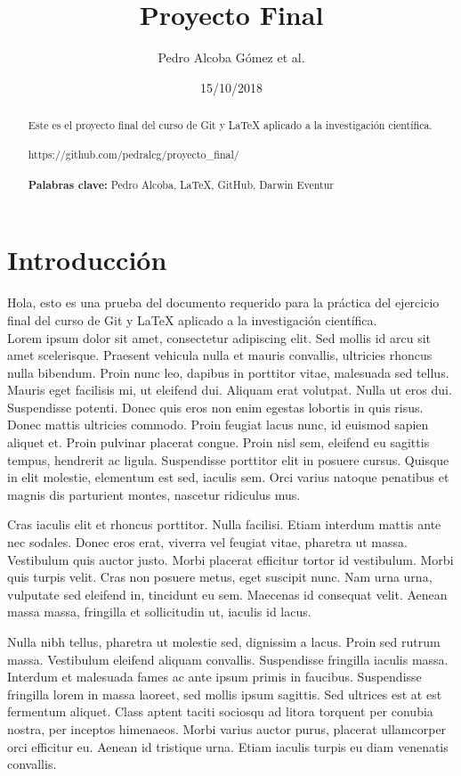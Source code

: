 \documentclass[a4paper,11pt]{article}
\begin{document}
\title{Proyecto Final}
\author{Pedro Alcoba Gómez et al.}
\date{15/10/2018}
\begin{abstract}
	Este es el proyecto final del curso de Git y \LaTeX{} aplicado a la investigación científica.\\\\https://github.com/pedralcg/proyecto\_final/ \\\\
\textbf{Palabras clave:} Pedro Alcoba, \LaTeX{}, GitHub, Darwin Eventur  
\end{abstract}
\tableofcontents
\maketitle
\part{Introducción}
Hola, esto es una prueba del documento requerido para la práctica del ejercicio final del curso de Git y \LaTeX{} aplicado a la investigación científica. \\

Lorem ipsum dolor sit amet, consectetur adipiscing elit. Sed mollis id arcu sit amet scelerisque. Praesent vehicula nulla et mauris convallis, ultricies rhoncus nulla bibendum. Proin nunc leo, dapibus in porttitor vitae, malesuada sed tellus. Mauris eget facilisis mi, ut eleifend dui. Aliquam erat volutpat. Nulla ut eros dui. Suspendisse potenti. Donec quis eros non enim egestas lobortis in quis risus. Donec mattis ultricies commodo. Proin feugiat lacus nunc, id euismod sapien aliquet et. Proin pulvinar placerat congue. Proin nisl sem, eleifend eu sagittis tempus, hendrerit ac ligula. Suspendisse porttitor elit in posuere cursus. Quisque in elit molestie, elementum est sed, iaculis sem. Orci varius natoque penatibus et magnis dis parturient montes, nascetur ridiculus mus.

Cras iaculis elit et rhoncus porttitor. Nulla facilisi. Etiam interdum mattis ante nec sodales. Donec eros erat, viverra vel feugiat vitae, pharetra ut massa. Vestibulum quis auctor justo. Morbi placerat efficitur tortor id vestibulum. Morbi quis turpis velit. Cras non posuere metus, eget suscipit nunc. Nam urna urna, vulputate sed eleifend in, tincidunt eu sem. Maecenas id consequat velit. Aenean massa massa, fringilla et sollicitudin ut, iaculis id lacus.

Nulla nibh tellus, pharetra ut molestie sed, dignissim a lacus. Proin sed rutrum massa. Vestibulum eleifend aliquam convallis. Suspendisse fringilla iaculis massa. Interdum et malesuada fames ac ante ipsum primis in faucibus. Suspendisse fringilla lorem in massa laoreet, sed mollis ipsum sagittis. Sed ultrices est at est fermentum aliquet. Class aptent taciti sociosqu ad litora torquent per conubia nostra, per inceptos himenaeos. Morbi varius auctor purus, placerat ullamcorper orci efficitur eu. Aenean id tristique urna. Etiam iaculis turpis eu diam venenatis convallis.
\end{document}
